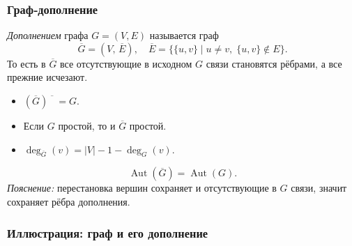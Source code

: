 \subsubsection{Граф‑дополнение}

\emph{Дополнением} графа $G=(V,E)$ называется граф
\[
  \overline{G} = (V,\,\overline{E}),
  \quad \overline{E} = \bigl\{\{u,v\}\mid u\neq v,\;\{u,v\}\notin E\bigr\}.
\]
То есть в $\overline{G}$ все отсутствующие в исходном $G$ связи становятся рёбрами, а все прежние исчезают.

\begin{itemize}[leftmargin=*]
  \item $(\overline{G})\!\!\overline{\phantom{G}} = G$.
  \item Если $G$ простой, то и $\overline{G}$ простой.
  \item $\deg_{\overline G}(v) = |V|-1 - \deg_G(v)$.
\end{itemize}


\vspace{-0.3em}
\[
  \operatorname{Aut}(\overline{G}) = \operatorname{Aut}(G).
\]
\emph{Пояснение:} перестановка вершин сохраняет и отсутствующие в $G$ связи, значит сохраняет рёбра дополнения.

\subsubsection{Иллюстрация: граф и его дополнение}

\begin{center}
\end{center}

